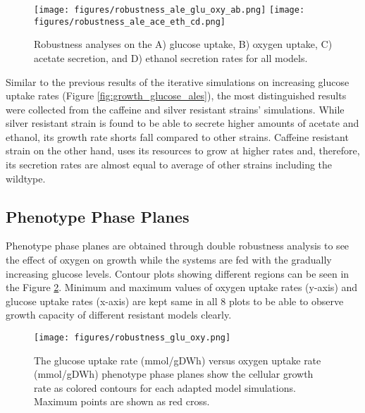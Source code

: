 \begin{figure}[H]
  \begin{center}
  \texttt{[image: figures/robustness\_ale\_glu\_oxy\_ab.png]}
  \texttt{[image: figures/robustness\_ale\_ace\_eth\_cd.png]}
  \caption[Robustness analyses on the A) glucose uptake, B) oxygen uptake, C) acetate secretion, and D) ethanol secretion rates for all models.]{Robustness analyses on the A) glucose uptake, B) oxygen uptake, C) acetate secretion, and D) ethanol secretion rates for all models.}
  \label{fig:robustness_ale}
  \end{center}
  \end{figure}
\vspace{-2.0cm}

Similar to the previous results of the iterative simulations on increasing glucose uptake rates (Figure \ref{fig:growth_glucose_ales}), the most distinguished results were collected from the caffeine and silver resistant strains' simulations. While silver resistant strain is found to be able to secrete higher amounts of acetate and ethanol, its growth rate shorts fall compared to other strains. Caffeine resistant strain on the other hand, uses its resources to grow at higher rates and, therefore, its secretion rates are almost equal to average of other strains including the wildtype.

\subsection{Phenotype Phase Planes}

Phenotype phase planes are obtained through double robustness analysis to see the effect of oxygen on growth while the systems are fed with the gradually increasing glucose levels. Contour plots showing different regions can be seen in the Figure \ref{fig:robustness_glu_oxy}. Minimum and maximum values of oxygen uptake rates (y-axis) and glucose uptake rates (x-axis) are kept same in all 8 plots to be able to observe growth capacity of different resistant models clearly.

\begin{figure}
  \begin{center}
  \texttt{[image: figures/robustness\_glu\_oxy.png]}
  \caption[The glucose uptake rate (mmol/gDWh) versus oxygen uptake rate (mmol/gDWh) phenotype phase planes show the cellular growth rate as colored contours for each adapted model simulations]{The glucose uptake rate (mmol/gDWh) versus oxygen uptake rate (mmol/gDWh) phenotype phase planes show the cellular growth rate as colored contours for each adapted model simulations. Maximum points are shown as red cross.}
  \label{fig:robustness_glu_oxy}
  \end{center}
  \end{figure}

